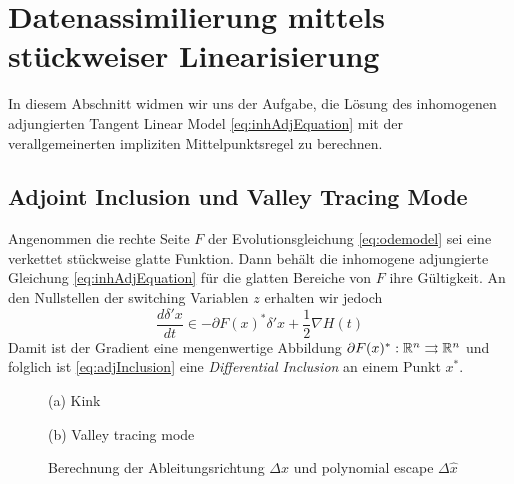 % 
\chapter{Datenassimilierung mittels stückweiser Linearisierung}
In diesem Abschnitt widmen wir uns der Aufgabe, die Lösung des inhomogenen adjungierten Tangent Linear Model \eqref{eq:inhAdjEquation} mit der verallgemeinerten impliziten Mittelpunktsregel zu berechnen.

\section{Adjoint Inclusion und Valley Tracing Mode}
\label{sec:adjointInclusion}
Angenommen die rechte Seite $F$ der Evolutionsgleichung \eqref{eq:odemodel} sei eine verkettet stückweise glatte Funktion. Dann behält die inhomogene adjungierte Gleichung \eqref{eq:inhAdjEquation} für die glatten Bereiche von $F$ ihre Gültigkeit. An den Nullstellen der switching Variablen $z$ erhalten wir jedoch
\begin{equation}
 \label{eq:adjInclusion}
 \frac{d \delta' x}{dt} \in- \partial F(x)^*\delta'x + \frac{1}{2}\nabla H(t)
\end{equation}
Damit ist der Gradient eine mengenwertige Abbildung $\partial F(x)^*:\mathbb{R}^n\rightrightarrows \mathbb{R}^n$ und folglich ist \eqref{eq:adjInclusion} eine \textit{Differential Inclusion} an einem Punkt $x^*$.


\begin{figure}
\centering
\begin{minipage}[b]{0.49\linewidth}
\centering

\caption*{(a) Kink}
\end{minipage}
\begin{minipage}[b]{0.49\linewidth}
\centering

\caption*{(b) Valley tracing mode}
\end{minipage}
\caption{Berechnung der Ableitungsrichtung $\Delta x$ und polynomial escape $\Delta \hat x$ }
\label{fig:adjValleyTracing}
\end{figure}

